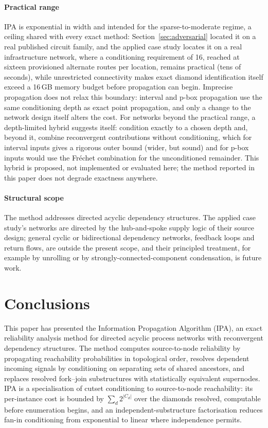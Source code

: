 \documentclass[preprint,12pt]{elsarticle}
\begin{document}
\paragraph{Practical range} IPA is exponential in width and intended for the sparse-to-moderate regime, a ceiling shared with every exact method: Section~\ref{sec:adversarial} located it on a real published circuit family, and the applied case study locates it on a real infrastructure network, where a conditioning requirement of 16, reached at sixteen provisioned alternate routes per location, remains practical (tens of seconds), while unrestricted connectivity makes exact diamond identification itself exceed a 16\,GB memory budget before propagation can begin. Imprecise propagation does not relax this boundary: interval and p-box propagation use the same conditioning depth as exact point propagation, and only a change to the network design itself alters the cost. For networks beyond the practical range, a depth-limited hybrid suggests itself: condition exactly to a chosen depth and, beyond it, combine reconvergent contributions without conditioning, which for interval inputs gives a rigorous outer bound (wider, but sound) and for p-box inputs would use the Fr\'echet combination for the unconditioned remainder. This hybrid is proposed, not implemented or evaluated here; the method reported in this paper does not degrade exactness anywhere.

\paragraph{Structural scope} The method addresses directed acyclic dependency structures. The applied case study's networks are directed by the hub-and-spoke supply logic of their source design; general cyclic or bidirectional dependency networks, feedback loops and return flows, are outside the present scope, and their principled treatment, for example by unrolling or by strongly-connected-component condensation, is future work.

\section{Conclusions}\label{sec:conclusions}

This paper has presented the Information Propagation Algorithm (IPA), an exact reliability analysis method for directed acyclic process networks with reconvergent dependency structures. The method computes source-to-node reliability by propagating reachability probabilities in topological order, resolves dependent incoming signals by conditioning on separating sets of shared ancestors, and replaces resolved fork--join substructures with statistically equivalent supernodes. IPA is a specialisation of cutset conditioning to source-to-node reachability: its per-instance cost is bounded by $\sum_d 2^{|C_d|}$ over the diamonds resolved, computable before enumeration begins, and an independent-substructure factorisation reduces fan-in conditioning from exponential to linear where independence permits.
\end{document}
